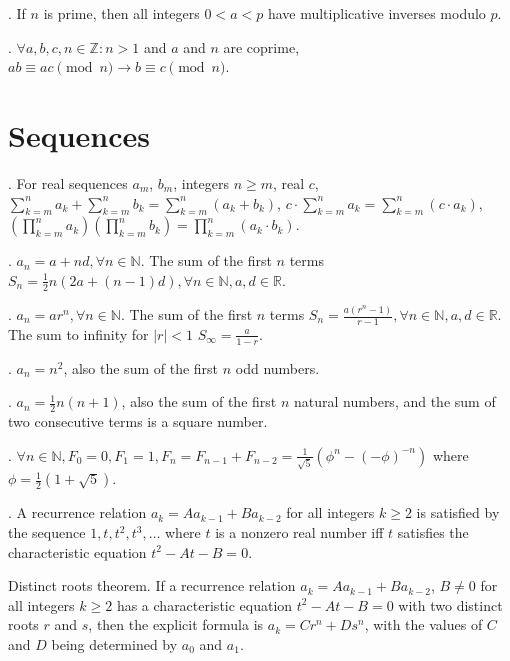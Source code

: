 \documentclass{slnotes}
\begin{document}
. If \(n\) is prime, then all integers \(0 < a < p\) have multiplicative inverses modulo \(p\).

. \(\forall a,b,c,n \in \mathbb{Z} : n > 1\) and \(a\) and \(n\) are coprime, \(ab \equiv ac \pmod n \to b \equiv c \pmod n\).

\chapter{Sequences}
. For real sequences \(a_m\), \(b_m\), integers \(n \ge m\), real \(c\), \(\sum^n_{k=m}a_k + \sum^n_{k=m}b_k = \sum^n_{k=m}(a_k+b_k)\), \(c\cdot\sum^n_{k=m}a_k = \sum^n_{k=m}(c\cdot a_k)\), \(\left(\prod^n_{k=m}a_k\right)\left(\prod^n_{k=m}b_k\right) = \prod^n_{k=m}(a_k\cdot b_k)\).

. \(a_n = a + nd, \forall n \in \mathbb{N}\). The sum of the first \(n\) terms \(S_n = \frac{1}{2}n(2a+(n-1)d), \forall n \in \mathbb{N}, a,d \in \mathbb{R}\).

. \(a_n = ar^n, \forall n \in \mathbb{N}\). The sum of the first \(n\) terms \(S_n = \frac{a(r^n-1)}{r-1}, \forall n \in \mathbb{N}, a,d \in \mathbb{R}\). The sum to infinity for \(\lvert r \rvert < 1\) \(S_\infty = \frac{a}{1-r}\).

. \(a_n = n^2\), also the sum of the first \(n\) odd numbers.

. \(a_n = \frac{1}{2}n(n+1)\), also the sum of the first \(n\) natural numbers, and the sum of two consecutive terms is a square number.

. \(\forall n \in \mathbb{N}, F_0 = 0, F_1 = 1, F_n = F_{n-1} + F_{n-2} = \frac{1}{\sqrt 5}(\phi^n - (-\phi)^{-n})\) where \(\phi = \frac{1}{2}(1 + \sqrt5)\).

. A recurrence relation \(a_k = Aa_{k-1} + Ba_{k-2}\) for all integers \(k \ge 2\) is satisfied by the sequence \(1, t, t^2, t^3, \hdots\) where \(t\) is a nonzero real number iff \(t\) satisfies the characteristic equation \(t^2 - At - B = 0\).

 Distinct roots theorem. If a recurrence relation \(a_k = Aa_{k-1} + Ba_{k-2}\), \(B \neq 0\) for all integers \(k \ge 2\) has a characteristic equation \(t^2 - At - B = 0\) with two distinct roots \(r\) and \(s\), then the explicit formula is \(a_k = Cr^n + Ds^n\), with the values of \(C\) and \(D\) being determined by \(a_0\) and \(a_1\).
\end{document}

